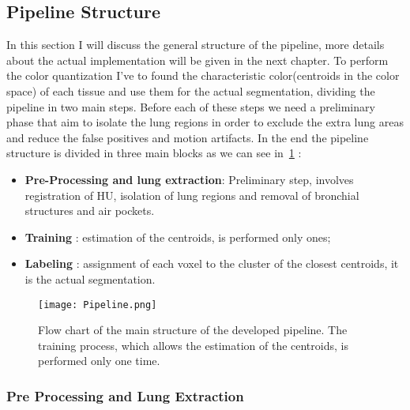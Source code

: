 \documentclass{standalone}
\begin{document}
	\subsection{Pipeline Structure}
	
	In this section I will discuss the general structure of the pipeline, more details about the actual implementation will be given in the next chapter.
	To perform the color quantization I've to found the characteristic color(centroids in the color space) of each tissue and use them for the actual segmentation, dividing the pipeline in two main steps. Before each of these steps we need a preliminary phase that aim to isolate the lung regions in order to exclude the extra lung areas and reduce the false positives and motion artifacts.
	In the end the pipeline structure is divided in three main blocks as we can see in \figurename\,\ref{fig:Pipeline} : 
	\begin{itemize}
		\item \textbf{Pre-Processing and lung extraction}: Preliminary step, involves registration of HU, isolation of lung regions and removal of bronchial structures and air pockets.
		
		\item \textbf{Training} : estimation of the centroids, is performed only ones; 
		
		\item \textbf{Labeling} :  assignment of each voxel to the cluster of the closest centroids, it is the actual segmentation.
	\end{itemize}
	
		
	\begin{figure}[h!]
		\centering 
			\texttt{[image: Pipeline.png]}
		\caption{Flow chart of the main structure of the developed pipeline. The training process, which allows the estimation of the centroids, is performed only one time.}\label{fig:Pipeline}
	\end{figure} 
	
	\subsubsection*{Pre Processing and Lung Extraction}
	
\end{document}
